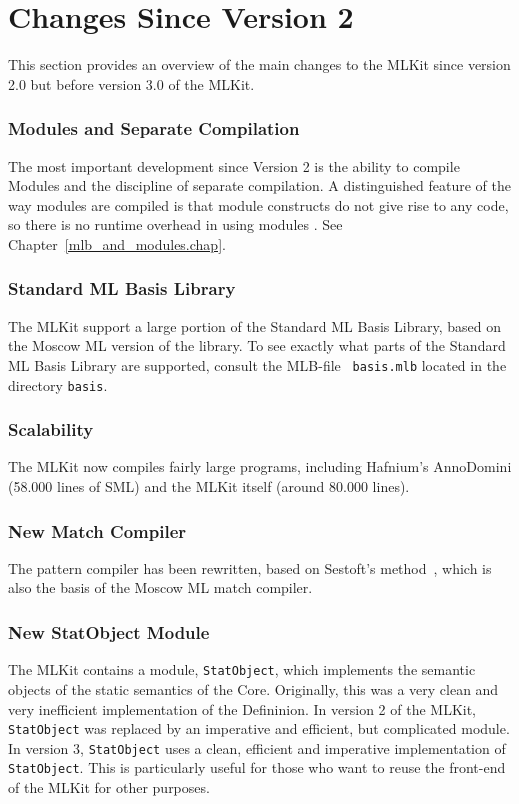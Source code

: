\documentclass[12pt]{book}
\begin{document}
\section{Changes Since Version 2}
%
This section provides an overview of the main changes to the MLKit
since version 2.0 but before version 3.0 of the MLKit.

\subsubsection*{Modules and Separate Compilation}
The most important development since Version 2 is the ability to
compile Modules and the discipline of separate compilation. A
distinguished feature of the way modules are compiled is that module
constructs do not give rise to any code, so there is no runtime
overhead in using modules \cite{ElsmanICFP99,ElsmanThesis}. See
Chapter~\ref{mlb_and_modules.chap}.

\subsubsection*{Standard ML Basis Library}
The MLKit support a large portion of the  Standard ML Basis Library, based on the Moscow ML
version of the library. To see exactly what parts of the Standard ML
Basis Library are supported, consult the MLB-file {\tt
  basis.mlb} located in the directory {\tt basis}.

\subsubsection*{Scalability}
The MLKit now compiles fairly large programs, including Hafnium's AnnoDomini
(58.000 lines of SML) and the MLKit itself (around 80.000 lines).

\subsubsection*{New Match Compiler}
The pattern compiler has been rewritten, based on Sestoft's
method~\cite{sestoft96}, which is also the basis of the Moscow ML
match compiler.

\subsubsection*{New StatObject Module}
The MLKit contains a module,
%
{\tt StatObject}, which implements the semantic objects of the static
semantics of the Core.  Originally, this was a very clean and very
inefficient implementation of the Defininion. In version 2 of the MLKit,
{\tt StatObject} was replaced by an imperative and efficient, but
complicated module.  In version 3, {\tt StatObject} uses a clean,
efficient and imperative implementation of {\tt StatObject}. This is
particularly useful for those who want to reuse the front-end of the
MLKit for other purposes.
\end{document}
